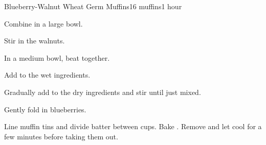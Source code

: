 \documentclass[../Cookbook.tex]{subfiles}
\begin{document}
\begin{recipe}{Blueberry-Walnut Wheat Germ Muffins}{16 muffins}{1 hour}


Combine in a large bowl.

Stir in the walnuts.

In a medium bowl, beat together.

Add to the wet ingredients.

Gradually add to the dry ingredients and stir until just mixed.

Gently fold in blueberries.

Line muffin tins and divide batter between cups. Bake . Remove and let cool for a few minutes before taking them out.


\end{recipe}
\end{document}
